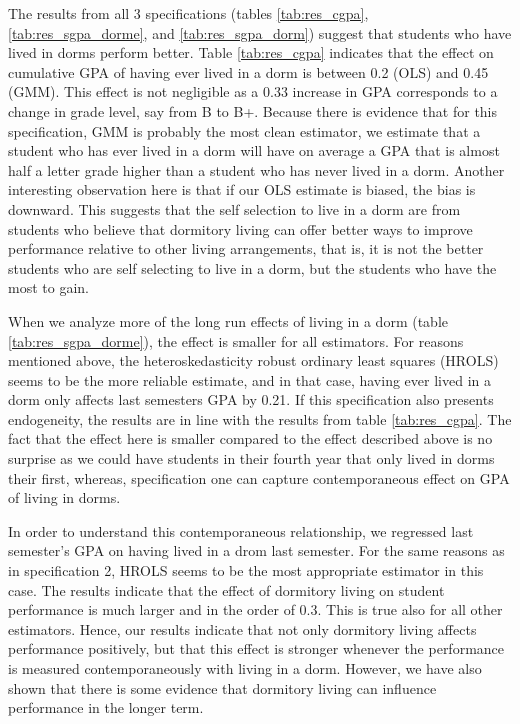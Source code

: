 \documentclass[12pt]{article}
\begin{document}
The results from all 3 specifications (tables \ref{tab:res_cgpa}, \ref{tab:res_sgpa_dorme}, and \ref{tab:res_sgpa_dorm}) suggest that students who have lived in dorms perform better. Table \ref{tab:res_cgpa} indicates that the effect on cumulative GPA of having ever lived in a dorm is between 0.2 (OLS) and 0.45 (GMM). This effect is not negligible as a 0.33 increase in GPA corresponds to a change in grade level, say from B to B+. Because there is evidence that for this specification, GMM is probably the most clean estimator, we estimate that a student who has ever lived in a dorm will have on average a GPA that is almost half a letter grade higher than a student who has never lived in a dorm. Another interesting observation here is that if our OLS estimate is biased, the bias is downward. This suggests that the self selection to live in a dorm are from students who believe that dormitory living can offer better ways to improve performance relative to other living arrangements, that is, it is not the better students who are self selecting to live in a dorm, but the students who have the most to gain.

When we analyze more of the long run effects of living in a dorm (table \ref{tab:res_sgpa_dorme}), the effect is smaller for all estimators. For reasons mentioned above, the heteroskedasticity robust ordinary least squares (HROLS) seems to be the more reliable estimate, and in that case, having ever lived in a dorm only affects last semesters GPA by 0.21. If this specification also presents endogeneity, the results are in line with the results from table \ref{tab:res_cgpa}. The fact that the effect here is smaller compared to the effect described above is no surprise as we could have students in their fourth year that only lived in dorms their first, whereas, specification one can capture contemporaneous effect on GPA of living in dorms.

In order to understand this contemporaneous relationship, we regressed last semester's GPA on having lived in a drom last semester. For the same reasons as in specification 2, HROLS seems to be the most appropriate estimator in this case. The results indicate that the effect of dormitory living on student performance is much larger and in the order of 0.3. This is true also for all other estimators. Hence, our results indicate that not only dormitory living affects performance positively, but that this effect is stronger whenever the performance is measured contemporaneously with living in a dorm. However, we have also shown that there is some evidence that dormitory living can influence performance in the longer term.
\end{document}
